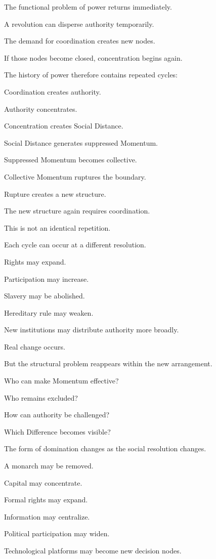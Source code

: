 The functional problem of power returns immediately.

A revolution can disperse authority temporarily.

The demand for coordination creates new nodes.

If those nodes become closed, concentration begins again.

The history of power therefore contains repeated cycles:

Coordination creates authority.

Authority concentrates.

Concentration creates Social Distance.

Social Distance generates suppressed Momentum.

Suppressed Momentum becomes collective.

Collective Momentum ruptures the boundary.

Rupture creates a new structure.

The new structure again requires coordination.

This is not an identical repetition.

Each cycle can occur at a different resolution.

Rights may expand.

Participation may increase.

Slavery may be abolished.

Hereditary rule may weaken.

New institutions may distribute authority more broadly.

Real change occurs.

But the structural problem reappears within the new arrangement.

Who can make Momentum effective?

Who remains excluded?

How can authority be challenged?

Which Difference becomes visible?

The form of domination changes as the social resolution changes.

A monarch may be removed.

Capital may concentrate.

Formal rights may expand.

Information may centralize.

Political participation may widen.

Technological platforms may become new decision nodes.

